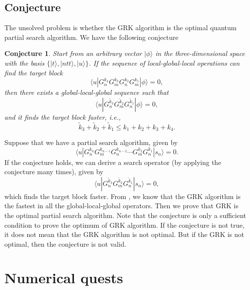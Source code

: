 \documentclass[a4paper,10pt]{article}
\newtheorem{conjecture}{Conjecture}
\numberwithin{equation}{section}
\begin{document}
\subsection{Conjecture}

The unsolved problem is whether the GRK algorithm is the optimal quantum partial search algorithm. We have the following conjecture \cite{korepin2006group}

\begin{conjecture}
    Start from an arbitrary vector $|\phi\rangle$ in the three-dimensional space with the basis $\{|t\rangle,|ntt\rangle,|u\rangle\}$. If the sequence of local-global-local operations can find the target block
    \begin{equation}
        \langle u|G_n^{k_4}G_m^{k_3}G_n^{k_2}G_m^{k_1}|\phi\rangle = 0,
    \end{equation}
    then there exists a global-local-global sequence such that 
    \begin{equation}
        \langle u|G_n^{\tilde k_3}G_m^{\tilde k_2}G_n^{\tilde k_1}|\phi\rangle = 0,
    \end{equation}
    and it finds the target block faster, i.e.,
    \begin{equation}
        \tilde k_3 + \tilde k_2 + \tilde k_1 \leq k_1+k_2+k_3+k_4.
    \end{equation}
\end{conjecture}

Suppose that we have a partial search algorithm, given by
\begin{equation}
    \langle u|G_n^{k_n}G_m^{k_{n-1}}G_n^{k_{n-2}}\cdots G_m^{k_2}G^{k_1}_n|s_n\rangle = 0.
\end{equation}
If the conjecture holds, we can derive a search operator (by applying the conjecture many times), given by
\begin{equation}
    \langle u|G_n^{\tilde k_3}G_m^{\tilde k_2}G_n^{\tilde k_1}|s_n\rangle = 0,
\end{equation}
which finds the target block faster. From \cite{korepin2006quest}, we know that the GRK algorithm is the fastest in all the global-local-global operators. Then we prove that GRK is the optimal partial search algorithm. Note that the conjecture is only a sufficient condition to prove the optimum of GRK algorithm. If the conjecture is not true, it does not mean that the GRK algorithm is not optimal. But if the GRK is not optimal, then the conjecture is not valid. 

\section{Numerical quests}
\end{document}
